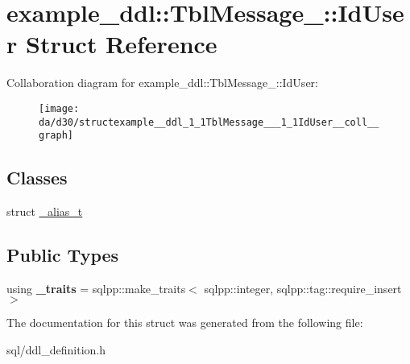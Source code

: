 \hypertarget{structexample__ddl_1_1TblMessage___1_1IdUser}{}\section{example\+\_\+ddl\+:\+:Tbl\+Message\+\_\+\+:\+:Id\+User Struct Reference}
\label{structexample__ddl_1_1TblMessage___1_1IdUser}


Collaboration diagram for example\+\_\+ddl\+:\+:Tbl\+Message\+\_\+\+:\+:Id\+User\+:
\nopagebreak
\begin{figure}[H]
\begin{center}
\leavevmode
\texttt{[image: da/d30/structexample\_\_ddl\_1\_1TblMessage\_\_\_1\_1IdUser\_\_coll\_\_graph]}
\end{center}
\end{figure}
\subsection*{Classes}
\begin{DoxyCompactItemize}
\item 
struct \hyperlink{structexample__ddl_1_1TblMessage___1_1IdUser_1_1__alias__t}{\+\_\+alias\+\_\+t}
\end{DoxyCompactItemize}
\subsection*{Public Types}
\begin{DoxyCompactItemize}
\item 
\hypertarget{structexample__ddl_1_1TblMessage___1_1IdUser_acc2569a2b66931b0de3f56619eb885eb}{}using {\bfseries \+\_\+traits} = sqlpp\+::make\+\_\+traits$<$ sqlpp\+::integer, sqlpp\+::tag\+::require\+\_\+insert $>$\label{structexample__ddl_1_1TblMessage___1_1IdUser_acc2569a2b66931b0de3f56619eb885eb}

\end{DoxyCompactItemize}


The documentation for this struct was generated from the following file\+:\begin{DoxyCompactItemize}
\item 
sql/ddl\+\_\+definition.\+h\end{DoxyCompactItemize}

